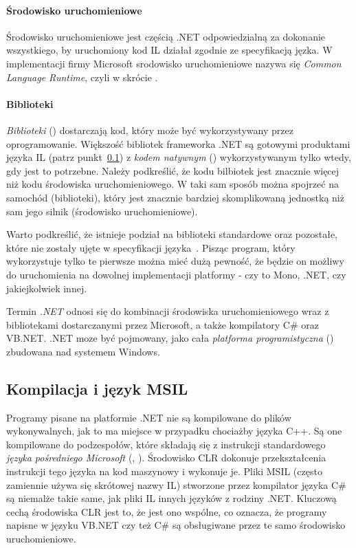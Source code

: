 \paragraph{Środowisko uruchomieniowe}
Środowisko uruchomieniowe jest częścią .NET odpowiedzialną za dokonanie wszystkiego, by uruchomiony kod IL działał zgodnie ze specyfikacją jęzka. W implementacji firmy Microsoft srodowisko uruchomieniowe nazywa się \emph{Common Language Runtime}, czyli w skrócie .

\paragraph{Biblioteki}
\emph{Biblioteki} () dostarczają kod, który może być wykorzystywany przez oprogramowanie. Większość bibliotek frameworka .NET są gotowymi produktami języka IL (patrz punkt~\ref{sec:msil}) z \emph{kodem natywnym} () wykorzystywanym tylko wtedy, gdy jest to potrzebne. Należy podkreślić, że kodu bilbiotek jest znacznie więcej niż kodu środowiska uruchomieniowego. W taki sam sposób można spojrzeć na samochód (biblioteki), który jest znacznie bardziej skomplikowaną jednostką niż sam jego silnik (środowisko uruchomieniowe).

Warto podkreślić, że istnieje podział na biblioteki standardowe oraz pozostałe, które nie zostały ujęte w specyfikacji języka~\cite{cSharp:spec}. Pisząc program, który wykorzystuje tylko te pierwsze można mieć dużą pewność, że będzie on możliwy do uruchomienia na dowolnej implementacji platformy - czy to Mono, .NET, czy jakiejkolwiek innej.

Termin \emph{.NET} odnosi się do kombinacji środowiska uruchomieniowego wraz z bibliotekami dostarczanymi przez Microsoft, a także kompilatory C\# oraz VB.NET. .NET moze być pojmowany, jako cała \emph{platforma programistyczna} () zbudowana nad systemem Windows.


\subsection{Kompilacja i język MSIL}\label{sec:msil}
Programy pisane na platformie .NET nie są kompilowane do plików wykonywalnych, jak to ma miejsce w przypadku chociażby języka C++. Są one kompilowane do podzespołów, które składają się z instrukcji standardowego \emph{języka pośredniego Microsoft} (, ). Środowisko CLR dokonuje przekształcenia instrukcji tego języka na kod maszynowy i wykonuje je. Pliki MSIL (często zamiennie używa się skrótowej nazwy IL) stworzone przez kompilator języka C\# są niemalże takie same, jak pliki IL innych języków z rodziny .NET. Kluczową cechą środowiska CLR jest to, że jest ono wspólne, co oznacza, że programy napisne w języku VB.NET czy też C\# są obsługiwane przez te samo środowisko uruchomieniowe.

